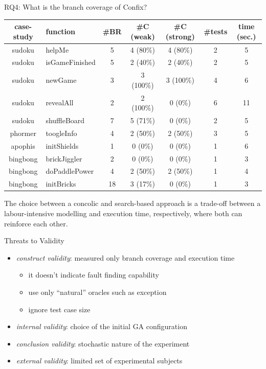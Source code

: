 \documentclass{beamer}
\begin{document}
\begin{frame}{RQ4: What is the branch coverage of Confix?}
\begin{table}
  \scriptsize
  \setlength\tabcolsep{2pt}
    \begin{tabular}{c|l|c|c|c|c|c}
      \toprule
      \textbf{case-study} & \textbf{function} & \textbf{\#BR} & \textbf{\#C (weak)} & \textbf{\#C (strong)} & \textbf{\#tests} & \textbf{time (sec.)} \\
      \hline
      sudoku & helpMe          & 5  & 4 (80\%)  & 4 (80\%)  & 2 & 5 \\
      sudoku & isGameFinished  & 5  & 2 (40\%)  & 2 (40\%)  & 2 & 5 \\
      sudoku & newGame         & 3  & 3 (100\%) & 3 (100\%) & 4 & 6 \\
      sudoku & revealAll       & 2  & 2 (100\%) & 0 (0\%)   & 6 & 11 \\
      sudoku & shuffleBoard    & 7  & 5 (71\%)  & 0 (0\%)   & 2 & 5  \\
      \hline
      phormer & toogleInfo     & 4  & 2 (50\%)  & 2 (50\%)  & 3 & 5 \\
      \hline
      apophis & initShields    & 1  & 0 (0\%)   & 0 (0\%)   & 1 & 6 \\
      \hline
      bingbong & brickJiggler  & 2  & 0 (0\%)   & 0 (0\%)   & 1  & 3 \\
      bingbong & doPaddlePower & 4  & 2 (50\%)  & 2 (50\%)  & 1  & 4 \\
      bingbong & initBricks    & 18 & 3 (17\%)  & 0 (0\%) & 1  & 3 \\
      \bottomrule
    \end{tabular}
\end{table}
\begin{block}{}
The choice between a concolic and search-based approach is a trade-off between a labour-intensive modelling and execution time, respectively, where both can reinforce each other.
\end{block}

\end{frame}


\begin{frame}{Threats to Validity}
\begin{itemize}
  \item \emph{construct validity}: measured only branch coverage and execution time
    \begin{itemize}
      \item it doesn't indicate fault finding capability
      \item use only ``natural'' oracles such as exception
      \item ignore test case size
    \end{itemize}    
  \item \emph{internal validity}: choice of the initial GA configuration 
  \item \emph{conclusion validity}: stochastic nature of the experiment
  \item \emph{external validity}: limited set of experimental subjects 
\end{itemize}
\end{frame}
\end{document}

